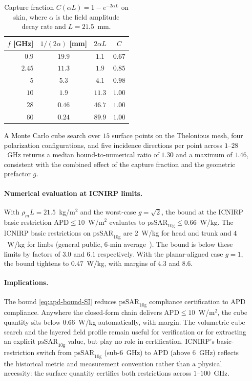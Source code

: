 \documentclass[journal,twocolumn,10pt]{IEEEtran}
\theoremstyle{plain}
\theoremstyle{remark}
\newcommand{\APD}{\mathrm{APD}}
\begin{document}
\begin{table}[h]
\centering
\caption{Capture fraction $C(\alpha L) = 1 - e^{-2\alpha L}$ on skin,
where $\alpha$ is the field amplitude decay rate and
$L = 21.5$~mm.}\label{tab:capture-SI}
\small
\begin{tabular}{rccc}
\toprule
$f$ [GHz] & $1/(2\alpha)$ [mm] & $2\alpha L$ & $C$ \\
\midrule
$0.9$  & $19.9$ & $1.1$  & $0.67$ \\
$2.45$ & $11.3$ & $1.9$  & $0.85$ \\
$5$    & $ 5.3$ & $4.1$  & $0.98$ \\
$10$   & $ 1.9$ & $11.3$ & $1.00$ \\
$28$   & $0.46$ & $46.7$ & $1.00$ \\
$60$   & $0.24$ & $89.9$ & $1.00$ \\
\bottomrule
\end{tabular}
\end{table}

A Monte Carlo cube search over $15$ surface points on the Thelonious
mesh, four polarization configurations, and five incidence directions
per point across $1$--$28$~GHz returns a median bound-to-numerical
ratio of $1.30$ and a maximum of $1.46$, consistent with the
combined effect of the capture fraction and the geometric prefactor
$g$.

\paragraph{Numerical evaluation at ICNIRP limits.}
With $\rho_m L = 21.5$~kg/m$^2$ and the worst-case $g = \sqrt{2}$,
the bound at the ICNIRP basic restriction $\APD \le 10$~W/m$^2$
evaluates to $\mathrm{psSAR}_{10\mathrm{g}} \le 0.66$~W/kg. The
ICNIRP basic restrictions on $\mathrm{psSAR}_{10\mathrm{g}}$ are
$2$~W/kg for head and trunk and $4$~W/kg for limbs (general public,
$6$-min average~\cite{ICNIRP2020}). The bound is below these limits
by factors of $3.0$ and $6.1$ respectively. With the planar-aligned
case $g = 1$, the bound tightens to $0.47$~W/kg, with margins of
$4.3$ and $8.6$.

\paragraph{Implications.}
The bound \eqref{eq:apd-bound-SI} reduces $\mathrm{psSAR}_{10\mathrm{g}}$
compliance certification to $\APD$ compliance. Anywhere the
closed-form chain delivers $\APD \le 10$~W/m$^2$, the cube quantity
sits below $0.66$~W/kg automatically, with margin. The volumetric
cube search and the layered field profile remain useful for
verification or for extracting an explicit
$\mathrm{psSAR}_{10\mathrm{g}}$ value, but play no role in
certification. ICNIRP's basic-restriction switch from
$\mathrm{psSAR}_{10\mathrm{g}}$ (sub-$6$~GHz) to $\APD$ (above
$6$~GHz) reflects the historical metric and measurement convention
rather than a physical necessity: the surface quantity certifies both
restrictions across $1$--$100$~GHz.
\end{document}
